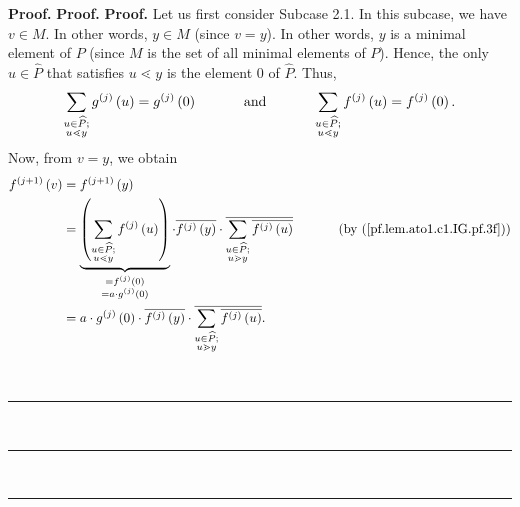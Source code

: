 \documentclass[numbers=enddot,12pt,final,onecolumn,notitlepage]{scrartcl}%
\theoremstyle{definition}
\newenvironment{verlong}{}{}
\newenvironment{proof}[1][Proof]{\noindent\textbf{#1.} }{\ \rule{0.5em}{0.5em}}
\let\sumnonlimits\sum
\renewcommand{\sum}{\sumnonlimits\limits}
\begin{document}
\begin{verlong}
\begin{proof}
\begin{proof}
\begin{proof}
Let us first consider Subcase 2.1. In this subcase, we have $v\in M$. In other
words, $y\in M$ (since $v=y$). In other words, $y$ is a minimal element of $P$
(since $M$ is the set of all minimal elements of $P$). Hence, the only
$u\in\widehat{P}$ that satisfies $u\lessdot y$ is the element $0$ of
$\widehat{P}$. Thus,
\[
\sum\limits_{\substack{u\in\widehat{P};\\u\lessdot y}}g^{\left(  j\right)
}\left(  u\right)  =g^{\left(  j\right)  }\left(  0\right)
\ \ \ \ \ \ \ \ \ \ \text{and}\ \ \ \ \ \ \ \ \ \ \sum\limits_{\substack{u\in
\widehat{P};\\u\lessdot y}}f^{\left(  j\right)  }\left(  u\right)  =f^{\left(
j\right)  }\left(  0\right)  .
\]
Now, from $v=y$, we obtain%
\begin{align}
f^{\left(  j+1\right)  }\left(  v\right)   &  =f^{\left(  j+1\right)  }\left(
y\right) \nonumber\\
&  =\underbrace{\left(  \sum\limits_{\substack{u\in\widehat{P};\\u\lessdot
y}}f^{\left(  j\right)  }\left(  u\right)  \right)  }_{\substack{=f^{\left(
j\right)  }\left(  0\right)  \\=a\cdot g^{\left(  j\right)  }\left(  0\right)
}}\cdot\overline{f^{\left(  j\right)  }\left(  y\right)  }\cdot\overline
{\sum\limits_{\substack{u\in\widehat{P};\\u\gtrdot y}}\overline{f^{\left(
j\right)  }\left(  u\right)  }}\ \ \ \ \ \ \ \ \ \ \left(  \text{by
(\ref{pf.lem.ato1.c1.IG.pf.3f})}\right) \nonumber\\
&  =a\cdot g^{\left(  j\right)  }\left(  0\right)  \cdot\overline{f^{\left(
j\right)  }\left(  y\right)  }\cdot\overline{\sum\limits_{\substack{u\in
\widehat{P};\\u\gtrdot y}}\overline{f^{\left(  j\right)  }\left(  u\right)  }%
}. \label{pf.lem.ato1.c1.IG.pf.5}%
\end{align}



\end{proof}
\end{proof}
\end{proof}
\end{verlong}
\end{document}
